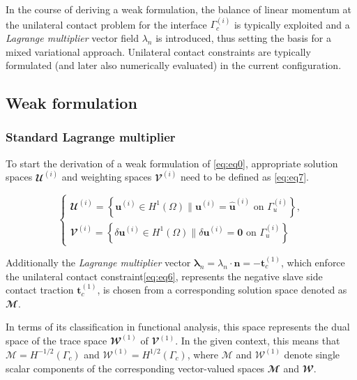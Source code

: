 \documentclass[a4paper,10pt]{article} %
\begin{document}
In the course of deriving a weak formulation, the balance of linear momentum at the unilateral contact problem  for the interface $\Gamma_c^{(i)}$ is typically exploited and a \textit{Lagrange multiplier} vector field $\lambda_n$ is introduced, thus setting the basis for a mixed variational approach. Unilateral contact constraints are typically
formulated (and later also numerically evaluated) in the current configuration.

\subsection{Weak formulation}

\subsubsection{Standard Lagrange multiplier}

To start the derivation of a weak formulation of \eqref{eq:eq0}, appropriate solution spaces $\mathbfcal{U}^{(i)}$ and
weighting spaces $\mathbfcal{V}^{(i)}$ need to be defined as \eqref{eq:eq7}.

\begin{equation}\label{eq:eq7}
    \begin{cases}
        \mathbfcal{U}^{(i)} = \left\{ \mathbf{u}^{(i)} \in H^1(\Omega) \| \mathbf{u}^{(i)} = \hat{\mathbf{u}}^{(i)} \text{ on } \Gamma_u^{(i)}\right\},\\
        \mathbfcal{V}^{(i)} = \left\{ \delta\mathbf{u}^{(i)} \in H^1(\Omega) \| \delta\mathbf{u}^{(i)} = \mathbf{0} \text{ on } \Gamma_u^{(i)}\right\}
    \end{cases}
\end{equation}

Additionally the \textit{Lagrange multiplier} vector $\boldsymbol{\lambda}_n = \lambda_n \cdot \mathbf{n} = -\mathbf{t}_c^{(1)}$, which enforce the unilateral contact constraint\eqref{eq:eq6}, represents the negative slave side contact traction $\mathbf{t}_c^{(1)}$, is chosen from a corresponding solution space denoted as $\mathbfcal{M}$.%


In terms of its classification in functional analysis, this space represents the dual space of the trace space $\mathbfcal{W}^{(1)}$ of $\mathbfcal{V}^{(1)}$. In the given context, this means that $\mathcal{M} = H^{−1/2} (\Gamma_c)$ and $\mathcal{W}^{(1)} = H^{1/2} (\Gamma_c)$, where $\mathcal{M}$  and $\mathcal{W}^{(1)}$ denote single scalar components of the corresponding vector-valued spaces $\mathbfcal{M}$ and $\mathbfcal{W}$.
\end{document}
